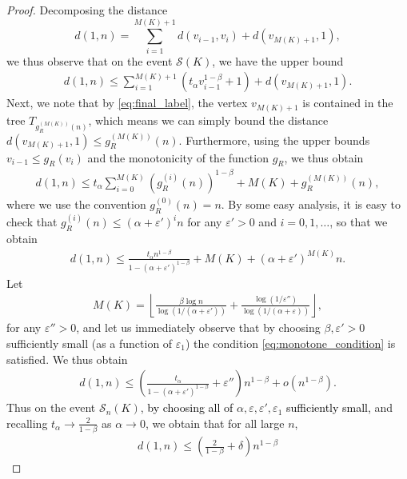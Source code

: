 \documentclass[letterpaper,11pt,reqno]{amsart}
\theoremstyle{definition}
\renewcommand{\leq}{\leqslant}
\newcommand{\eps}{\varepsilon}
\newcommand{\cS}{\mathcal{S}}\newcommand{\cT}{\mathcal{T}}\newcommand{\cU}{\mathcal{U}}
\begin{document}
\begin{proof}
Decomposing the distance
\begin{equation}\label{eq:dist_decomp}
    d(1,n)=\sum_{i=1}^{M(K)+1} d(v_{i-1},v_i)+d(v_{M(K)+1},1),
\end{equation}
we thus observe that on the event $\cS(K)$, we have the upper bound
\begin{align*}
    d(1,n)\leq \sum_{i=1}^{M(K)+1} (t_{\alpha}v_{i-1}^{1-\beta}+1)+d(v_{M(K)+1},1).
\end{align*}
Next, we note that by \eqref{eq:final_label}, the vertex $v_{M(K)+1}$ is contained in the tree $T_{g_R^{(M(K))}(n)}$, which means we can simply bound the distance $d(v_{M(K)+1},1)\leq g_R^{(M(K))}(n)$. Furthermore, using the upper bounds $v_{i-1}\leq g_R(v_i)$ and the monotonicity of the function $g_{R}$, we thus obtain
\begin{align*}
    d(1,n)\leq t_{\alpha}\sum_{i=0}^{M(K)}(g_R^{(i)}(n))^{1-\beta}+M(K)+g_R^{(M(K))}(n),
\end{align*}
where we use the convention $g_R^{(0)}(n)=n$. By some easy analysis, it is easy to check that $g_R^{(i)}(n)\leq (\alpha+\eps')^{i}n$ for any $\eps'>0$ and $i=0,1,\dots$, so that we obtain
\begin{align*}
    d(1,n)\leq \frac{t_{\alpha}n^{1-\beta}}{1-(\alpha+\eps')^{1-\beta}}+M(K)+(\alpha+\eps')^{M(K)}n.
\end{align*}
Let 
\begin{align*}
    M(K)=\left\lfloor \frac{\beta \log n}{\log(1/(\alpha+\eps'))}+\frac{\log(1/\eps'')}{\log(1/(\alpha+\eps))}\right\rfloor,
\end{align*}
for any $\eps''>0$, and let us immediately observe that by choosing $\beta,\eps'>0$ sufficiently small (as a function of $\eps_1$) the condition \eqref{eq:monotone_condition} is satisfied. We thus obtain
\begin{align*}
    d(1,n)\leq \left(\frac{t_{\alpha}}{1-(\alpha+\eps')^{1-\beta}}+\eps'' \right)n^{1-\beta}+o(n^{1-\beta}).
\end{align*}
Thus on the event $\cS_n(K)$, \textcolor{black}{by choosing all of} $\alpha,\eps,\eps', \eps_1$ \textcolor{black}{sufficiently small,} %
and recalling $t_{\alpha}\to \frac{2}{1-\beta}$ as $\alpha\to 0$, we obtain that for all large $n$,
\begin{align*}
    d(1,n)\leq \left(\frac{2}{1-\beta}+\delta \right)n^{1-\beta}

\end{align*}
\end{proof}
\end{document}
